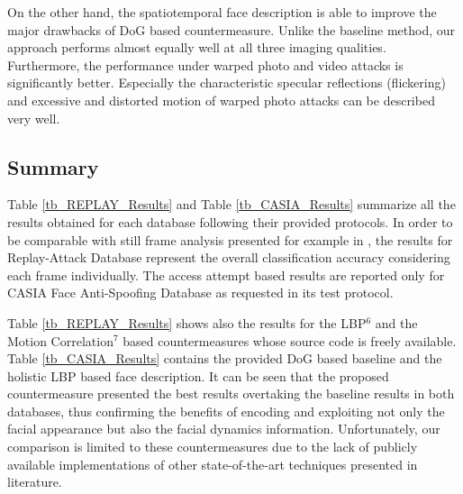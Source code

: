 On the other hand, the spatiotemporal face description is able to improve the major drawbacks of DoG based countermeasure. Unlike the baseline method, our approach performs almost equally well at all three imaging qualities. Furthermore, the performance under warped photo and video attacks is significantly better. Especially the characteristic specular reflections (flickering) and excessive and distorted motion of warped photo attacks can be described very well.

\subsection{Summary}
\label{sec_summary}

Table \ref{tb_REPLAY_Results} and Table \ref{tb_CASIA_Results} summarize all the results obtained for each database following their provided protocols. In order to be comparable with still frame analysis presented for example in \cite{ChingovskaBIOSIG2012}, the results for Replay-Attack Database represent the overall classification accuracy considering each frame individually. The access attempt based results are reported only for CASIA Face Anti-Spoofing Database as requested in its test protocol.

Table \ref{tb_REPLAY_Results} shows also the results for the LBP$^6$ \cite{ChingovskaBIOSIG2012} and the Motion Correlation$^7$ \cite{AnjosIJCB2011} based countermeasures whose source code is freely available. Table \ref{tb_CASIA_Results} contains the provided DoG based baseline and the holistic LBP based face description. It can be seen that the proposed countermeasure presented the best results overtaking the baseline results in both databases, thus confirming the benefits of encoding and exploiting not only the facial appearance but also the facial dynamics information. Unfortunately, our comparison is limited to these countermeasures due to the lack of publicly available implementations of other state-of-the-art techniques presented in literature. 

